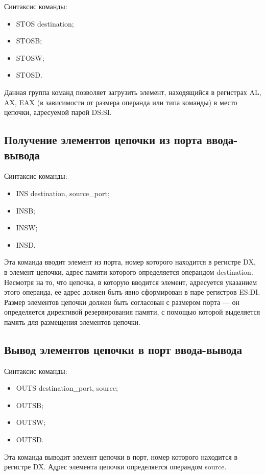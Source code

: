 Синтаксис команды:
\begin{itemize}
\item STOS destination;
\item STOSB;
\item STOSW;
\item STOSD.
\end{itemize}

Данная группа команд позволяет загрузить элемент, находящийся в регистрах AL, AX, EAX
(в зависимости от размера операнда или типа команды) в место цепочки, адресуемой парой DS:SI.

\subsection{Получение элементов цепочки из порта ввода-вывода}

Синтаксис команды:
\begin{itemize}
\item INS destination, source\_port;
\item INSB;
\item INSW;
\item INSD.
\end{itemize}

Эта команда вводит элемент из порта, номер которого находится в регистре DX,
в элемент цепочки, адрес памяти которого определяется операндом destination.
Несмотря на то, что цепочка, в которую вводится элемент, адресуется указанием
этого операнда, ее адрес должен быть явно сформирован в паре регистров
ES:DI. Размер элементов цепочки должен быть согласован с размером порта ---
он определяется директивой резервирования памяти, с помощью которой выделяется
память для размещения элементов цепочки.

\subsection{Вывод элементов цепочки в порт ввода-вывода}

Синтаксис команды:
\begin{itemize}
\item OUTS destination\_port, source;
\item OUTSB;
\item OUTSW;
\item OUTSD.
\end{itemize}

Эта команда выводит элемент цепочки в порт, номер которого находится в регистре DX.
Адрес элемента цепочки определяется операндом source.

